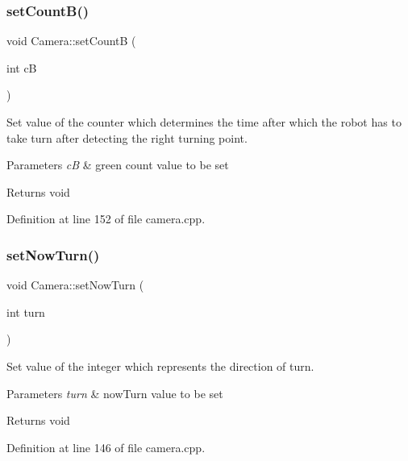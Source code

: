 \subsubsection{\texorpdfstring{set\+Count\+B()}{setCountB()}}
{\footnotesize\ttfamily void Camera\+::set\+CountB (\begin{DoxyParamCaption}\item[{int}]{cB }\end{DoxyParamCaption})}



Set value of the counter which determines the time after which the robot has to take turn after detecting the right turning point. 


\begin{DoxyParams}{Parameters}
{\em cB} & green count value to be set \\
\hline
\end{DoxyParams}
\begin{DoxyReturn}{Returns}
void 
\end{DoxyReturn}


Definition at line 152 of file camera.\+cpp.

\mbox{\label{class_camera_a77cd72118fd9d03e04beaf60f7345138}} 
\subsubsection{\texorpdfstring{set\+Now\+Turn()}{setNowTurn()}}
{\footnotesize\ttfamily void Camera\+::set\+Now\+Turn (\begin{DoxyParamCaption}\item[{int}]{turn }\end{DoxyParamCaption})}



Set value of the integer which represents the direction of turn. 


\begin{DoxyParams}{Parameters}
{\em turn} & now\+Turn value to be set \\
\hline
\end{DoxyParams}
\begin{DoxyReturn}{Returns}
void 
\end{DoxyReturn}


Definition at line 146 of file camera.\+cpp.

\mbox{\label{class_camera_ab51102514272832890346b414759e716}} 
